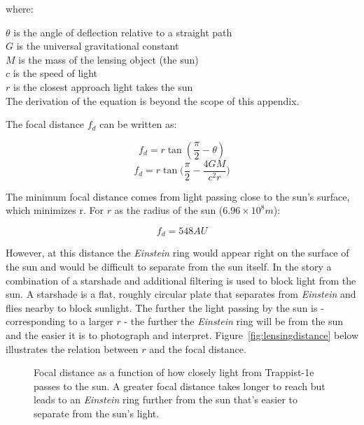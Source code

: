 \documentclass[12pt]{article} %
\begin{document}
where:

$\theta$ is the angle of deflection relative to a straight path\\
$G$ is the universal gravitational constant\\
$M$ is the mass of the lensing object (the sun)\\
$c$ is the speed of light\\
$r$ is the closest approach light takes the sun\\

The derivation of the equation is beyond the scope of this appendix.

The focal distance $f_d$ can be written as:

$$f_d = r\tan (\frac{\pi}{2} - \theta)$$
$$f_d = r\tan\bigg(\frac{\pi}{2} - \frac{4GM}{c^2r}\bigg)$$

The minimum focal distance comes from light passing close to the sun's surface, which minimizes r. For $r$ as the radius of the sun ($6.96 \times 10^8 m$):

$$f_d =  548AU$$

However, at this distance the \textit{Einstein} ring would appear right on the surface of the sun and would be difficult to separate from the sun itself. In the story a combination of a starshade and additional filtering is used to block light from the sun. A starshade is a flat, roughly circular plate that separates from \textit{Einstein} and flies nearby to block sunlight. The further the light passing by the sun is - corresponding to a larger $r$ - the further the \textit{Einstein} ring will be from the sun and the easier it is to photograph and interpret. Figure~\ref{fig:lensingdistance} below illustrates the relation between $r$ and the focal distance. 

\begin{figure}[H]
	\caption{Focal distance as a function of how closely light from Trappist-1e passes to the sun. A greater focal distance takes longer to reach but leads to an \textit{Einstein} ring further from the sun that's easier to separate from the sun's light.}
	\label{lensingdistance}
\end{figure}
\end{document}
